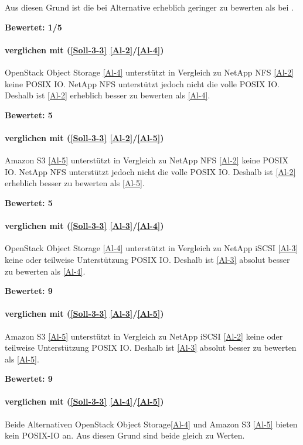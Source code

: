 Aus diesen Grund ist die  bei Alternative erheblich  geringer zu bewerten als bei .

\textbf{Bewertet: 1/5}

\paragraph*{  verglichen mit  (\ref{Soll-3-3} \ref{Al-2}/\ref{Al-4})}
OpenStack Object Storage \ref{Al-4} unterstützt in Vergleich zu NetApp NFS \ref{Al-2} keine POSIX IO. NetApp NFS unterstützt jedoch nicht die volle POSIX IO. Deshalb ist \ref{Al-2} erheblich besser zu bewerten als \ref{Al-4}.

\textbf{Bewertet: 5}

\paragraph*{  verglichen mit  (\ref{Soll-3-3} \ref{Al-2}/\ref{Al-5})}
Amazon S3 \ref{Al-5} unterstützt in Vergleich zu NetApp NFS \ref{Al-2} keine POSIX IO. NetApp NFS unterstützt jedoch nicht die volle POSIX IO. Deshalb ist \ref{Al-2} erheblich besser zu bewerten als \ref{Al-5}.

\textbf{Bewertet: 5}

\paragraph*{  verglichen mit  (\ref{Soll-3-3} \ref{Al-3}/\ref{Al-4})}
OpenStack Object Storage \ref{Al-4} unterstützt in Vergleich zu NetApp iSCSI \ref{Al-3} keine oder teilweise Unterstützung POSIX IO. Deshalb ist \ref{Al-3} absolut besser zu bewerten als \ref{Al-4}.

\textbf{Bewertet: 9}

\paragraph*{  verglichen mit  (\ref{Soll-3-3} \ref{Al-3}/\ref{Al-5})}
Amazon S3 \ref{Al-5} unterstützt in Vergleich zu NetApp iSCSI \ref{Al-2} keine oder teilweise Unterstützung POSIX IO. Deshalb ist \ref{Al-3} absolut besser zu bewerten als \ref{Al-5}.

\textbf{Bewertet: 9}


\paragraph*{  verglichen mit  (\ref{Soll-3-3} \ref{Al-4}/\ref{Al-5})}
Beide Alternativen OpenStack Object Storage\ref{Al-4} und Amazon S3 \ref{Al-5} bieten kein POSIX-IO an. Aus diesen Grund sind beide gleich zu Werten.

